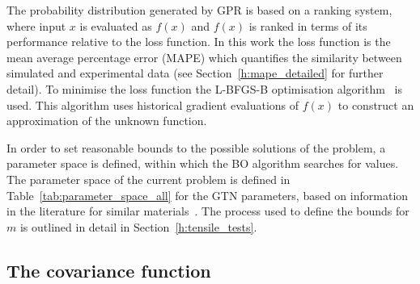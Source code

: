 \documentclass[preprint, review, 12pt]{elsarticle}
\begin{document}
	The probability distribution generated by GPR is based on a ranking system, where input $x$ is evaluated as $f(x)$ and $f(x)$ is ranked in terms of its performance relative to the loss function.
	In this work the loss function is the mean average percentage error (MAPE) which quantifies the similarity between simulated and experimental data (see Section~\ref{h:mape_detailed} for further detail).
	To minimise the loss function the L-BFGS-B optimisation algorithm~\cite{ZHU1997} is used.
	This algorithm uses historical gradient evaluations of $f(x)$ to construct an approximation of the unknown function.

	In order to set reasonable bounds to the possible solutions of the problem, a parameter space is defined, within which the BO algorithm searches for values.
	The parameter space of the current problem is defined in Table~\ref{tab:parameter_space_all} for the GTN parameters, based on information in the literature for similar materials~\cite{KIRAN2014,MEADE2020,DASSAULT2021}.
	The process used to define the bounds for $m$ is outlined in detail in Section~\ref{h:tensile_tests}.

	
	\subsection{The covariance function}
	\label{h:covariance_function}
\end{document}
